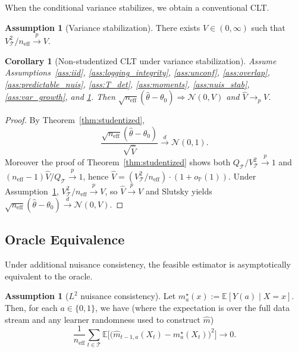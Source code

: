 \documentclass[11pt]{article}
\numberwithin{equation}{section}
\theoremstyle{plain}
\newtheorem{corollary}[theorem]{Corollary}
\theoremstyle{definition}
\newtheorem{assumption}[theorem]{Assumption}
\theoremstyle{remark}
\newcommand{\E}{\mathbb{E}}
\newcommand{\Pp}{\mathbb{P}}
\newcommand{\pto}{\xrightarrow{p}}
\newcommand{\dto}{\xrightarrow{d}}
\begin{document}
When the conditional variance stabilizes, we obtain a conventional CLT.

\begin{assumption}[Variance stabilization]\label{ass:stab}
There exists $V \in (0,\infty)$ such that $V_{\mathcal{T}}^2/n_{\mathrm{eff}} \pto V$.
\end{assumption}

\begin{corollary}[Non-studentized CLT under variance stabilization]\label{cor:nonstudentized}
Assume Assumptions~\ref{ass:iid}, \ref{ass:logging_integrity}, \ref{ass:unconf}, \ref{ass:overlap}, \ref{ass:predictable_nuis}, \ref{ass:T_det}, \ref{ass:moments}, \ref{ass:nuis_stab}, \ref{ass:var_growth}, and \ref{ass:stab}. Then $\sqrt{n_{\mathrm{eff}}}(\widehat{\theta}-\theta_0)\Rightarrow \mathcal{N}(0,V)$ and $\widehat V\to_p V$.
\end{corollary}

\begin{proof}
By Theorem~\ref{thm:studentized},
\[
\frac{\sqrt{n_{\mathrm{eff}}}(\widehat\theta-\theta_0)}{\sqrt{\widehat V}} \dto \mathcal{N}(0,1).
\]
Moreover the proof of Theorem~\ref{thm:studentized} shows both
$Q_{\mathcal{T}}/V_{\mathcal{T}}^2\pto 1$ and
$(n_{\mathrm{eff}}-1)\widehat V/Q_{\mathcal{T}}\pto 1$, hence
$\widehat V = (V_{\mathcal{T}}^2/n_{\mathrm{eff}})\cdot(1+o_{\Pp}(1))$.
Under Assumption~\ref{ass:stab}, $V_{\mathcal{T}}^2/n_{\mathrm{eff}}\pto V$,
so $\widehat V\pto V$ and Slutsky yields
$\sqrt{n_{\mathrm{eff}}}(\widehat\theta-\theta_0)\dto \mathcal{N}(0,V)$.
\end{proof}

\subsection{Oracle Equivalence}\label{sec:oracle_equiv}

Under additional nuisance consistency, the feasible estimator is asymptotically equivalent to the oracle.

\begin{assumption}[$L^2$ nuisance consistency]\label{ass:l2}
Let $m_a^\star(x):=\E[Y(a)\mid X=x]$. Then, for each $a\in\{0,1\}$, we have (where the expectation is over the full data stream and any learner randomness used to construct $\widehat m$)
\[
\frac{1}{n_{\mathrm{eff}}}\sum_{t\in\mathcal{T}}
\E\Big[
\big(\widehat m_{t-1,a}(X_t)-m_a^\star(X_t)\big)^2
\Big]\to 0.
\]
\end{assumption}
\end{document}
